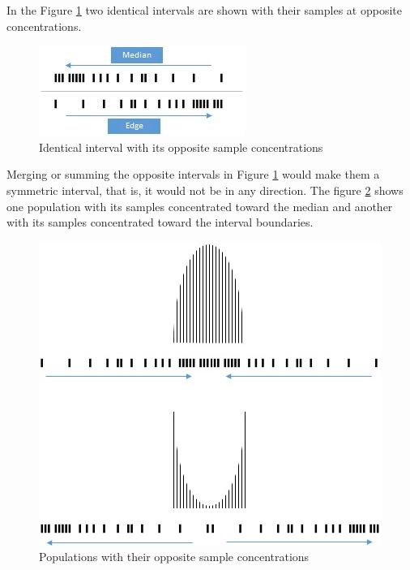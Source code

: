 In the Figure \ref{fig:consciousness_concentration_of_opposite_samples} two identical intervals are shown with their samples at opposite concentrations.
	\begin{figure}[H]
	\caption{Identical interval with its opposite sample concentrations}
	\label{fig:consciousness_concentration_of_opposite_samples}
	\centering
	\includegraphics[scale=1.2]{sections/images/consciousness_concentration_of_opposite_samples.jpg}
	\end{figure}

Merging or summing the opposite intervals in Figure \ref{fig:consciousness_concentration_of_opposite_samples} would make them a symmetric interval, that is, it would not be in any direction.
The figure \ref{fig:consciousness_concentration_of_opposite_samples_within_range} shows one population with its samples concentrated toward the median and another with its samples concentrated toward the interval boundaries.
	\begin{figure}[H]
	\caption{Populations with their opposite sample concentrations}
	\label{fig:consciousness_concentration_of_opposite_samples_within_range}
	\centering
	\includegraphics[scale=.7]{sections/images/consciousness_concentration_of_opposite_samples_within_range.jpg}
	\end{figure}


